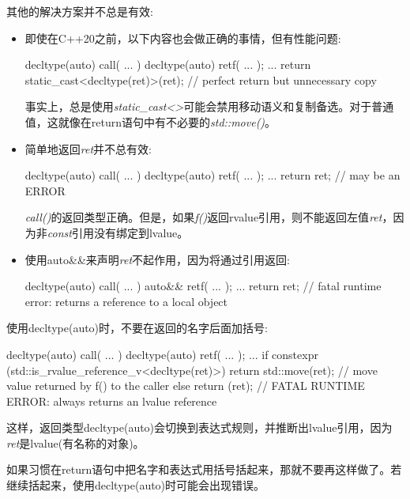 其他的解决方案并不总是有效:\par

\begin{itemize}
  \item 即使在C++20之前，以下内容也会做正确的事情，但有性能问题:\par
\begin{codebox}[cpp]
    decltype(auto) call( ... )
    {
      decltype(auto) ret{f( ... )};
      ...
      return static_cast<decltype(ret)>(ret); // perfect return but unnecessary copy
    }
\end{codebox}
  事实上，总是使用\textit{static\_\allowbreak{}cast<\allowbreak{}>}可能会禁用移动语义和复制备选。对于普通值，这就像在return语句中有不必要的\textit{std::move()}。
  \item 简单地返回\textit{ret}并不总有效:
\begin{codebox}[cpp]
    decltype(auto) call( ... )
    {
      decltype(auto) ret{f( ... )};
      ...
      return ret; // may be an ERROR
    }
\end{codebox}
  \textit{call()}的返回类型正确。但是，如果\textit{f()}返回rvalue引用，则不能返回左值\textit{ret}，因为非\textit{const}引用没有绑定到lvalue。
  \item 使用auto\&\&来声明\textit{ret}不起作用，因为将通过引用返回:
\begin{codebox}[cpp]
    decltype(auto) call( ... )
    {
      auto&& ret{f( ... )};
      ...
      return ret; // fatal runtime error: returns a reference to a local object
    }
\end{codebox}
\end{itemize}

使用decltype(auto)时，不要在返回的名字后面加括号:\par

\begin{codebox}[cpp]
  decltype(auto) call( ... )
  {
    decltype(auto) ret{f( ... )};
    ...
    if constexpr (std::is_rvalue_reference_v<decltype(ret)>) {
      return std::move(ret); // move value returned by f() to the caller
    }
    else {
      return (ret); // FATAL RUNTIME ERROR: always returns an lvalue reference
    }
  }
\end{codebox}

这样，返回类型decltype(auto)会切换到表达式规则，并推断出lvalue引用，因为\textit{ret}是lvalue(有名称的对象)。\par

如果习惯在return语句中把名字和表达式用括号括起来，那就不要再这样做了。若继续括起来，使用decltype(auto)时可能会出现错误。\par

